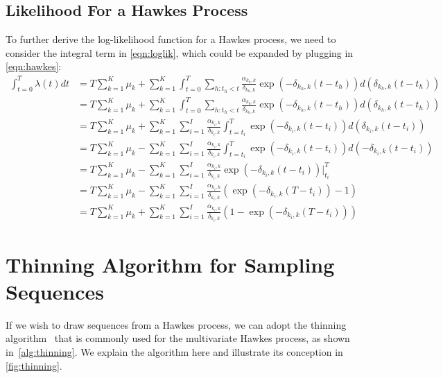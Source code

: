 \documentclass{article}
\begin{document}

\subsection{Likelihood For a Hawkes Process}\label{sec:likhawkes}
To further derive the log-likelihood function for a Hawkes process, we need to consider the integral term in \cref{eqn:loglik}, which could be expanded by plugging in \cref{eqn:hawkes}:
\begin{subequations}
\begin{align}
\int_{t=0}^{T} \lambda(t)dt 
&= T \sum_{k=1}^{K} \mu_k + \sum_{k=1}^{K} \int_{t=0}^{T} \sum_{h:t_h < t} \frac{\alpha_{k_h,k}}{\delta_{k_h,k}} \exp(-\delta_{k_h,k}(t-t_h)) d(\delta_{k_h,k}(t-t_h))\\
&= T \sum_{k=1}^{K} \mu_k + \sum_{k=1}^{K} \int_{t=0}^{T} \sum_{h:t_h < t} \frac{\alpha_{k_h,k}}{\delta_{k_h,k}} \exp(-\delta_{k_h,k}(t-t_h)) d(\delta_{k_h,k}(t-t_h))\\
&= T \sum_{k=1}^{K} \mu_k + \sum_{k=1}^{K} \sum_{i=1}^{I} \frac{\alpha_{k_i,k}}{\delta_{k_i,k}} \int_{t=t_i}^{T} \exp(-\delta_{k_i,k}(t-t_i)) d(\delta_{k_i,k}(t-t_i))\\
&= T \sum_{k=1}^{K} \mu_k - \sum_{k=1}^{K} \sum_{i=1}^{I} \frac{\alpha_{k_i,k}}{\delta_{k_i,k}} \int_{t=t_i}^{T} \exp(-\delta_{k_i,k}(t-t_i)) d(-\delta_{k_i,k}(t-t_i))\\
&= T \sum_{k=1}^{K} \mu_k - \sum_{k=1}^{K} \sum_{i=1}^{I} \frac{\alpha_{k_i,k}}{\delta_{k_i,k}} \exp(-\delta_{k_i,k}(t-t_i)) |_{t_i}^{T}\\
&= T \sum_{k=1}^{K} \mu_k - \sum_{k=1}^{K} \sum_{i=1}^{I} \frac{\alpha_{k_i,k}}{\delta_{k_i,k}} (\exp(-\delta_{k_i,k}(T-t_i)) - 1 )\\
&= T \sum_{k=1}^{K} \mu_k + \sum_{k=1}^{K} \sum_{i=1}^{I} \frac{\alpha_{k_i,k}}{\delta_{k_i,k}} ( 1 - \exp(-\delta_{k_i,k}(T-t_i)) )
\end{align}
\end{subequations}

\section{Thinning Algorithm for Sampling Sequences}
\label{sec:thinning}

If we wish to draw sequences from a Hawkes process, we can adopt the thinning algorithm~\citep{lewis-79-sim,liniger-09-hawkes} that is commonly used for the multivariate Hawkes process, as shown in~\cref{alg:thinning}.  We explain the algorithm here and illustrate its conception in \cref{fig:thinning}.
\end{document}
